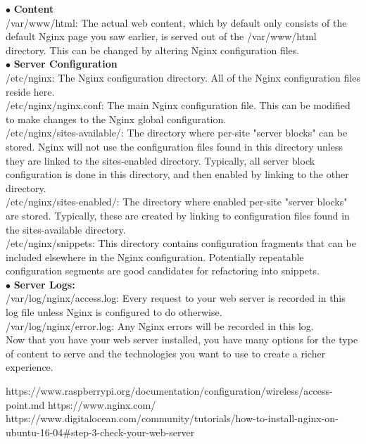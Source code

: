 \documentclass[journal,12pt,onecolumn]{IEEEtran}
\begin{document}
\begin{flushleft}
$\bullet$ \textbf{Content}\\
\textsf{/var/www/html:} The actual web content, which by default only consists of the default Nginx page you saw earlier, is served out of the /var/www/html directory. This can be changed by altering Nginx configuration files.\\
\bigskip
$\bullet$ \textbf{Server Configuration}\\
\medskip
\textsf{/etc/nginx:} The Nginx configuration directory. All of the Nginx configuration files reside here.\\
\medskip
\textsf{/etc/nginx/nginx.conf:} The main Nginx configuration file. This can be modified to make changes to the Nginx global configuration.\\
\medskip
\textsf{/etc/nginx/sites-available/:} The directory where per-site "server blocks" can be stored. Nginx will not use the configuration files found in this directory unless they are linked to the sites-enabled directory. Typically, all server block configuration is done in this directory, and then enabled by linking to the other directory.\\
\medskip
\textsf{/etc/nginx/sites-enabled/:} The directory where enabled per-site "server blocks" are stored. Typically, these are created by linking to configuration files found in the sites-available directory.\\
\medskip
\textsf{/etc/nginx/snippets:} This directory contains configuration fragments that can be included elsewhere in the Nginx configuration. Potentially repeatable configuration segments are good candidates for refactoring into snippets.\\
\bigskip
$\bullet$ \textbf{Server Logs:} \\
\medskip
\textsf{/var/log/nginx/access.log:}  Every request to your web server is recorded in this log file unless Nginx is configured to do otherwise.\\
\medskip
\textsf{/var/log/nginx/error.log:}  Any Nginx errors will be recorded in this log.\\
\medskip
Now that you have your web server installed, you have many options for the type of content to serve and the technologies you want to use to create a richer experience.\\

\end{flushleft}
\begin{thebibliography}{9}
https://www.raspberrypi.org/documentation/configuration/wireless/access-point.md
https://www.nginx.com/
https://www.digitalocean.com/community/tutorials/how-to-install-nginx-on-ubuntu-16-04\#step-3-check-your-web-server
\end{thebibliography}
\end{document}

